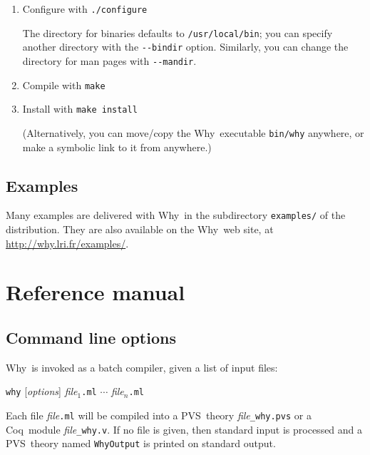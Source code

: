 \documentclass[a4paper,12pt]{report}
\newcommand{\pvs}{\textsf{PVS}}
\newcommand{\coq}{\textsf{Coq}}
\newcommand{\why}{\textsf{Why}}
\begin{document}
\begin{enumerate}
\item Configure with \texttt{./configure}

  The directory for binaries defaults to \texttt{/usr/local/bin}; you
  can specify another directory with the \texttt{-{}-bindir}
  option. Similarly, you can change the directory for man pages with
  \texttt{-{}-mandir}.

\item Compile with \texttt{make}

\item Install with \texttt{make install}

  (Alternatively, you can move/copy the \why\ executable
  \texttt{bin/why} anywhere, or make a symbolic link to it from anywhere.)
\end{enumerate}


\section{Examples}
\label{examples}

Many examples are delivered with \why\ in the
subdirectory \texttt{examples/} of the distribution.
They are also available on the \why\ web site, at
\url{http://why.lri.fr/examples/}.



\chapter{Reference manual}
\label{refman}


\section{Command line options}
\label{usage}

\why\ is invoked as a batch compiler, given a list of input files:
\begin{center}
  \texttt{why} [\textit{options}] \textit{file}$_1$\texttt{.ml} $\cdots$
    \textit{file}$_n$\texttt{.ml}
\end{center}
Each file \textit{file}\texttt{.ml} will be compiled into a \pvs\ theory
\textit{file}\texttt{\_why.pvs} or a \coq\ module
\textit{file}\texttt{\_why.v}.
If no file is given, then standard input is processed and a \pvs\ theory
named \texttt{WhyOutput} is printed on standard output.
\end{document}
